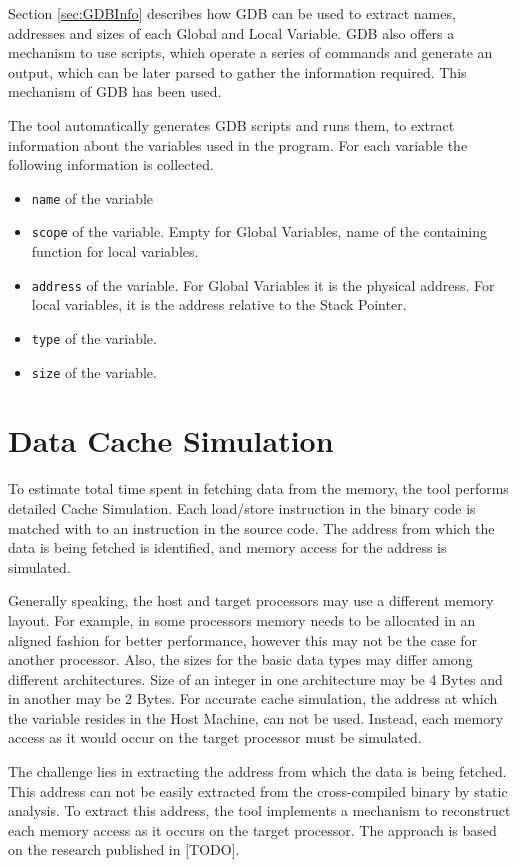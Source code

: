 Section \ref{sec:GDBInfo} describes how GDB can be used to extract names, addresses and sizes of each Global and Local Variable. GDB also offers a mechanism to use scripts, which operate a series of commands and generate an output, which can be later parsed to gather the information required. This mechanism of GDB has been used.

The tool automatically generates GDB scripts and runs them, to extract information about the variables used in the program. For each variable the following information is collected.

\begin{itemize} \itemsep -6pt
\item \texttt{name} of the variable
\item \texttt{scope} of the variable. Empty for Global Variables, name of the containing function for local variables.
\item \texttt{address} of the variable. For Global Variables it is the physical address. For local variables, it is the address relative to the Stack Pointer.
\item \texttt{type} of the variable.
\item \texttt{size} of the variable.
\end{itemize}

\section{Data Cache Simulation}
To estimate total time spent in fetching data from the memory, the tool performs detailed Cache Simulation. Each load/store instruction in the binary code is matched with to an instruction in the source code. The address from which the data is being fetched is identified, and memory access for the address is simulated. 

Generally speaking, the host and target processors may use a different memory layout. For example, in some processors memory needs to be allocated in an aligned fashion for better performance, however this may not be the case for another processor. Also, the sizes for the basic data types may differ among different architectures. Size of an integer in one architecture may be 4 Bytes and in another may be 2 Bytes. For accurate cache simulation, the address at which the variable resides in the Host Machine, can not be used. Instead, each memory access as it would occur on the target processor must be simulated.

The challenge lies in extracting the address from which the data is being fetched. This address can not be easily extracted from the cross-compiled binary by static analysis. To extract this address, the tool implements a mechanism to reconstruct each memory access as it occurs on the target processor. The approach is based on the research published in [TODO].

